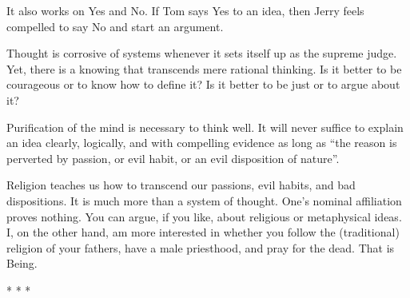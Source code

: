 It also works on Yes and No. If Tom says Yes to an idea, then Jerry feels compelled to say No and start an argument.

Thought is corrosive of systems whenever it sets itself up as the supreme judge. Yet, there is a knowing that transcends mere rational thinking. Is it better to be courageous or to know how to define it? Is it better to be just or to argue about it?

Purification of the mind is necessary to think well. It will never suffice to explain an idea clearly, logically, and with compelling evidence as long as ``the reason is perverted by passion, or evil habit, or an evil disposition of nature''.

Religion teaches us how to transcend our passions, evil habits, and bad dispositions. It is much more than a system of thought. One's nominal affiliation proves nothing. You can argue, if you like, about religious or metaphysical ideas. I, on the other hand, am more interested in whether you follow the (traditional) religion of your fathers, have a male priesthood, and pray for the dead. That is Being.



\begin{center}* * *\end{center}


